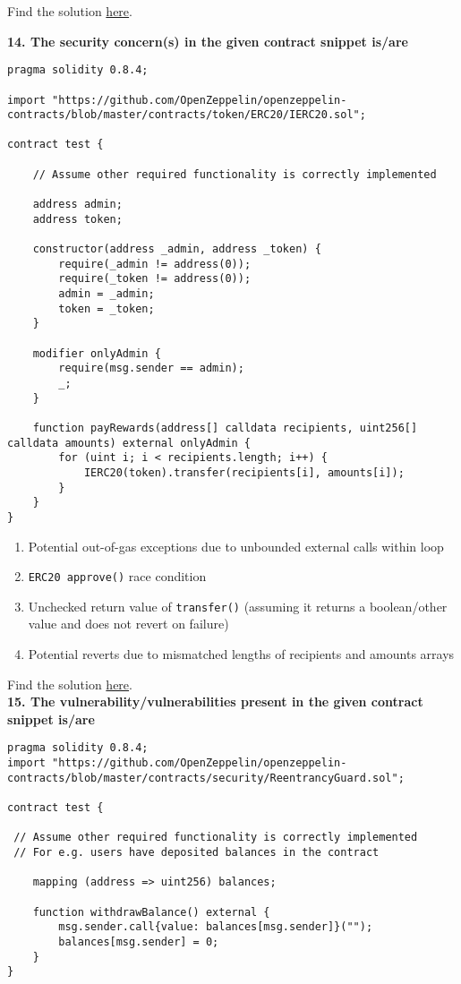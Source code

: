Find the solution \hyperref[sec:exam4_q13]{here}.\\

\pagebreak

\textbf{14. The security concern(s) in the given contract snippet is/are}

\begin{lstlisting}[language=Solidity, style=solStyle]
pragma solidity 0.8.4;

import "https://github.com/OpenZeppelin/openzeppelin-contracts/blob/master/contracts/token/ERC20/IERC20.sol";

contract test {

    // Assume other required functionality is correctly implemented

    address admin;
    address token;

    constructor(address _admin, address _token) {
        require(_admin != address(0));
        require(_token != address(0));
        admin = _admin;
        token = _token;
    }

    modifier onlyAdmin {
        require(msg.sender == admin);
        _;
    }

    function payRewards(address[] calldata recipients, uint256[] calldata amounts) external onlyAdmin {
        for (uint i; i < recipients.length; i++) {
            IERC20(token).transfer(recipients[i], amounts[i]);
        }
    }
}
\end{lstlisting}

\begin{enumerate}[label=\Alph*.]
    \item Potential out-of-gas exceptions due to unbounded external calls within loop
    \item\verb|ERC20 approve()| race condition
    \item Unchecked return value of \verb|transfer()| (assuming it returns a boolean/other value and does not revert on failure)
    \item Potential reverts due to mismatched lengths of recipients and amounts arrays
\end{enumerate}

Find the solution \hyperref[sec:exam4_q14]{here}.\\

\textbf{15. The vulnerability/vulnerabilities present in the given contract snippet is/are}

\begin{lstlisting}[language=Solidity, style=solStyle]
pragma solidity 0.8.4;
import "https://github.com/OpenZeppelin/openzeppelin-contracts/blob/master/contracts/security/ReentrancyGuard.sol";

contract test {

 // Assume other required functionality is correctly implemented
 // For e.g. users have deposited balances in the contract

    mapping (address => uint256) balances;

    function withdrawBalance() external {
        msg.sender.call{value: balances[msg.sender]}("");
        balances[msg.sender] = 0;
    }
}
\end{lstlisting}

